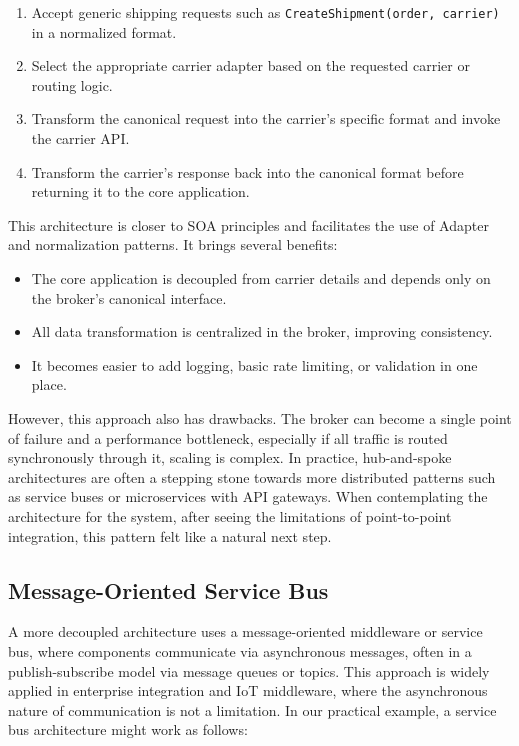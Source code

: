 \documentclass{imc-inf}
\begin{document}
\begin{enumerate}[label=\arabic*., left=0pt, itemsep=3pt]
  \item Accept generic shipping requests such as \verb|CreateShipment(order, carrier)| in a normalized format.
  \item Select the appropriate carrier adapter based on the requested carrier or routing logic.
  \item Transform the canonical request into the carrier's specific format and invoke the carrier API.
  \item Transform the carrier's response back into the canonical format before returning it to the core application.
\end{enumerate}

This architecture is closer to SOA principles and facilitates the use of Adapter and normalization patterns.
It brings several benefits:

\begin{itemize}[itemsep=3pt]
  \item The core application is decoupled from carrier details and depends only on the broker's canonical interface.
  \item All data transformation is centralized in the broker, improving consistency.
  \item It becomes easier to add logging, basic rate limiting, or validation in one place.
\end{itemize}

However, this approach also has drawbacks.
The broker can become a single point of failure and a performance bottleneck, especially if all traffic is routed synchronously through it, scaling is complex.
In practice, hub-and-spoke architectures are often a stepping stone towards more distributed patterns such as service buses or microservices with API gateways.
When contemplating the architecture for the system, after seeing the limitations of point-to-point integration, this pattern felt like a natural next step.

\subsection{Message-Oriented Service Bus}

A more decoupled architecture uses a message-oriented middleware or service bus, where components communicate via asynchronous messages, often in a publish-subscribe model via message queues or topics.
This approach is widely applied in enterprise integration and IoT middleware, where the asynchronous nature of communication is not a limitation.
In our practical example, a service bus architecture might work as follows:
\end{document}
